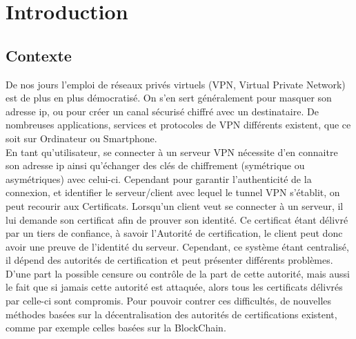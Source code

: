 \documentclass[12pt, openany]{report}
\begin{document}
\newpage
\renewcommand{\contentsname}{Sommaire}
\begin{spacing}{0.8}
\tableofcontents
\end{spacing}
\newpage

\section{Introduction}
\subsection{Contexte}
\noindent 
\begin{flushleft}
De nos jours l'emploi de réseaux privés virtuels (VPN, Virtual Private Network) est de plus en plus démocratisé. On s'en sert généralement pour masquer son adresse ip, ou pour créer un canal sécurisé chiffré avec un destinataire. De nombreuses applications, services et protocoles de VPN différents existent, que ce soit sur Ordinateur ou Smartphone.\\
En tant qu'utilisateur, se connecter à un serveur VPN nécessite d'en connaitre son adresse ip ainsi qu'échanger des clés de chiffrement (symétrique ou asymétriques) avec celui-ci. Cependant pour garantir l'authenticité de la connexion, et identifier le serveur/client avec lequel le tunnel VPN s'établit, on peut recourir aux Certificats. Lorsqu'un client veut se connecter à un serveur, il lui demande son certificat afin de prouver son identité. Ce certificat étant délivré par un tiers de confiance, à savoir l'Autorité de certification, le client peut donc avoir une preuve de l'identité du serveur. Cependant, ce système étant centralisé, il dépend des autorités de certification et peut présenter différents problèmes. D'une part la possible censure ou contrôle de la part de cette autorité, mais aussi le fait que si jamais cette autorité est attaquée, alors tous les certificats délivrés par celle-ci sont compromis. Pour pouvoir contrer ces difficultés, de nouvelles méthodes basées sur la décentralisation des autorités de certifications existent, comme par exemple celles basées sur la BlockChain.\\
\end{flushleft}
\end{document}
